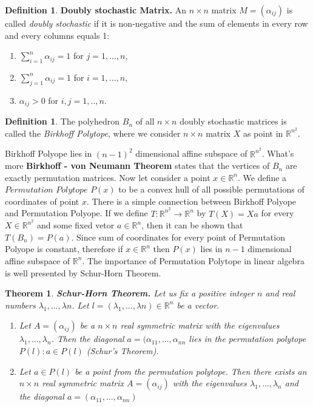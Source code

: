 \documentclass{article}
\theoremstyle{plain}
\newtheorem{theorem}[thm]{Theorem}
\theoremstyle{definition}
\newtheorem{definition}[thm]{Definition}
\begin{document}
\begin{definition}\label{def4}
    \textbf{Doubly stochastic Matrix.} An  $n \times n $  matrix $M=(\alpha_{ij}) $ is called \textit{doubly stochastic} if it is non-negative and the sum of elements in every row and every columns equals 1:
    \begin{enumerate}
        \item $ \sum_{i=1}^{n}\alpha_{ij} =1 $ for $j=1,... ,n$,
        \item $ \sum_{j=1}^{n}\alpha_{ij}=1 $ for $i=1,... ,n$,
        \item $\alpha_{ij} >0$ for $i,j=1,.. ,n$.
    \end{enumerate}
    
\end{definition}
\begin{definition}
    The polyhedron $B_{n}$ of all $n \times n$ doubly stochastic matrices is called the \textit{Birkhoff Polytope}, where  
    we consider  $n \times n $ matrix $X$ as point in $\mathbb{R}^{n^2}$.
\end{definition}
Birkhoff Polyope lies in $(n-1)^2$ dimensional affine subspace of $\mathbb{R}^{n^2}$. \newline 
What's more  \textbf{Birkhoff - von Neumann Theorem} states that the vertices of $B_n$ are exactly permutation matrices. \newline 
Now let consider a point $x \in \mathbb{R}^n$. We define a $\textit{Permutation Polytope}$ $P(x)$ to be a convex hull of all possible permutations of coordinates of  point $x$.
There is a simple connection between Birkhoff Polyope and Permutation Polyope. 
If we define $T: \mathbb{R}^{n^2} \rightarrow \mathbb{R}^n$ by $T(X) = Xa$ for every $X \in \mathbb{R}^{n^2}$ and some fixed vetor $a \in \mathbb{R}^n$,
then it can be shown that $T(B_n) = P(a)$. \newline
Since sum of coordinates for every point of Permutation Polyope is constant, therefore if $x \in \mathbb{R}^n$ then $P(x)$ lies in $n-1$ dimensional affine subspace of $\mathbb{R}^n$.
The importance of Permutation Polytope in linear algebra is well presented by Schur-Horn Theorem. 

\begin{theorem}\cite{Convexity}
    \textbf{Schur-Horn Theorem.} Let us fix a positive integer $n$ and real numbers $\lambda_{1},...,\lambda{n}$. Let $l=(\lambda_{1},...,\lambda{n}) \in \mathbb{R}^n$ be a vector.
    \begin{enumerate}
        \item [1.] Let $A=(\alpha_{ij})$ be a $n\times n$ real symmetric matrix with the eigenvalues $\lambda_{1},...,\lambda_{n}$. Then the diagonal $a = (\alpha_{11},...,\alpha_{nn}$ lies in the permutation polytope $P(l): a \in P(l)$ (Schur's Theorem).
        \item[2.] Let $a \in P(l)$ be a point from the permutation polytope. Then there exists an $n \times n$ real symmetric matrix $A=(\alpha_{ij})$ with the eigenvalues $\lambda_{1},...,\lambda_{n}$ and the diagonal $a = (\alpha_{11},...,\alpha_{nn})$
    \end{enumerate}
\end{theorem}
\end{document}
